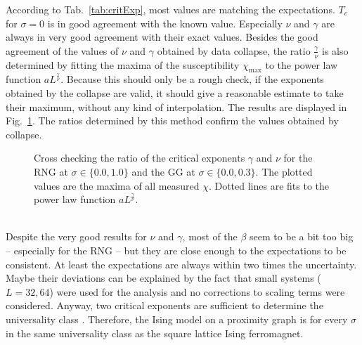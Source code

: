     According to Tab.\ \ref{tab:critExp}, most values
    are matching the expectations.
    \(T_c\) for \(\sigma = 0\) is in good
    agreement with the known value. Especially \(\nu\) and \(\gamma\)
    are always in very good agreement with their exact values. Besides the
    good agreement of the values of \(\nu\) and \(\gamma\) obtained by data collapse,
    the ratio \(\frac{\gamma}{\nu}\) is also determined by fitting the maxima of
    the susceptibility \(\chi_{\mathrm{max}}\) to the power law function \(aL^\frac{\gamma}{\nu}\).
    Because this should only be a rough check, if the exponents obtained
    by the collapse are valid, it should give a
    reasonable estimate to take their maximum, without any kind of interpolation.
    The results are displayed in Fig.\ \ref{fig:susCrossCheck}. The ratios
    determined by this method confirm the values obtained by collapse.
    \begin{figure}[htbp]
        \centering
        \caption[Alternative Way Determining $\gamma / \nu$]
        {
            Cross checking the ratio of the critical exponents $\gamma$ and $\nu$ for
                 the RNG at $\sigma \in \{0.0, 1.0\}$ and
                 the GG at $\sigma \in \{0.0, 0.3\}$.
            The plotted values are the maxima of all measured \(\chi\).
            Dotted lines are fits to the power law function \(aL^\frac{\gamma}{\nu}\).
        }
        \label{fig:susCrossCheck}
    \end{figure}\\
    Despite the very good results for \(\nu\) and \(\gamma\), most of the
    \(\beta\) seem to be a bit too big -- especially for the RNG -- but
    they are close enough to the expectations to be consistent. At least
    the expectations are always within two times the uncertainty.
    Maybe their deviations can be explained by the fact that small
    systems (\(L=32,64\)) were used for the analysis and no corrections
    to scaling terms were considered.
    Anyway, two critical exponents are sufficient to determine the
    universality class \cite[p. 145]{Katzgraber2011}. Therefore,
    the Ising model on a proximity graph is for every \(\sigma\) in the
    same universality class as the square lattice Ising ferromagnet.

